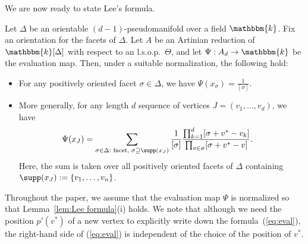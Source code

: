 We are now ready to state Lee's formula.
\begin{lemma}{\cite[Lemma 3.1, Theorem 3.2]{KX}} \label{lem:Lee formula}
Let $\Delta$ be an orientable $(d-1)$-pseudomanifold over a field $\mathbbm{k}$.
Fix an orientation for the facets of $\Delta$.
Let $A$ be an Artinian reduction of $\mathbbm{k}[\Delta]$ with respect to an l.s.o.p.~$\Theta$, and let $\Psi:A_d \rightarrow \mathbbm{k}$ be the evaluation map.
Then, under a suitable normalization, the following hold:
\begin{itemize}
    \item[(i)] For any positively oriented facet $\sigma \in \Delta$, we have $\Psi(x_\sigma)=\frac{1}{[\sigma]}$.
    \item[(ii)] More generally, for any length $d$ sequence of vertices $J=(v_1,\ldots,v_d)$, we have
\begin{align} 
\Psi(x_J)&=\sum_{\sigma \in \Delta:\text{ facet, }\sigma \supseteq \supp(x_J)} \frac{1}{[\sigma]} \frac{\prod_{k=1}^{d}[\sigma + v^* - v_k]}{\prod_{v \in \sigma} [\sigma+v^*-v]} .\label{eq:eval}
\end{align}
Here, the sum is taken over all positively oriented facets of $\Delta$ containing $\supp(x_J):=\{v_1,\ldots,v_n\}$.
\end{itemize}
\end{lemma}
Throughout the paper, we assume that the evaluation map $\Psi$ is normalized so that Lemma~\ref{lem:Lee formula}(i) holds.
We note that although we need the position $p'(v^*)$ of a new vertex to explicitly write down the formula~(\ref{eq:eval}), the right-hand side of (\ref{eq:eval}) is independent of the choice of the position of $v^*$.

